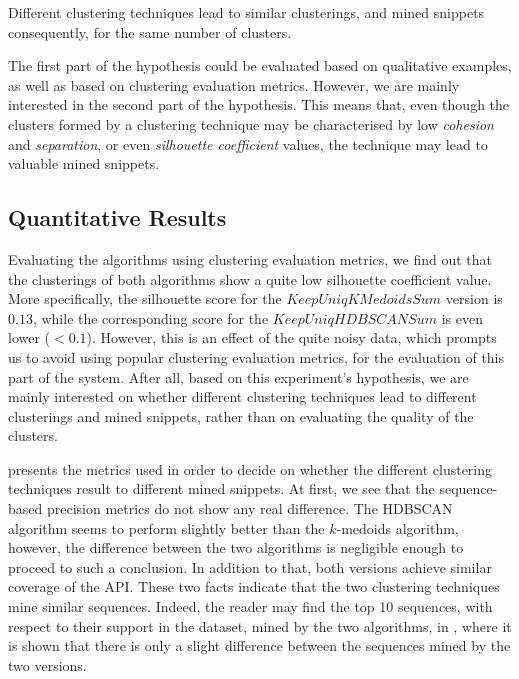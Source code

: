 \begin{hypothesis}
Different clustering techniques lead to similar clusterings, and mined snippets consequently, for the same number of clusters.
\end{hypothesis}

The first part of the hypothesis could be evaluated based on qualitative examples, as well as based on clustering evaluation metrics. However, we are mainly interested in the second part of the hypothesis. This means that, even though the clusters formed by a clustering technique may be characterised by low \textit{cohesion} and \textit{separation}, or even \textit{silhouette coefficient} values, the technique may lead to valuable mined snippets.


\subsection{Quantitative Results}
\label{subsec:evaluation-exp3-quantitative}

Evaluating the algorithms using clustering evaluation metrics, we find out that the clusterings of both algorithms show a quite low silhouette coefficient value. More specifically, the silhouette score for the $KeepUniqKMedoidsSum$ version is $0.13$, while the corresponding score for the $KeepUniqHDBSCANSum$ is even lower ($<0.1$). However, this is an effect of the quite noisy data, which prompts us to avoid using popular clustering evaluation metrics, for the evaluation of this part of the system. After all, based on this experiment's hypothesis, we are mainly interested on whether different clustering techniques lead to different clusterings and mined snippets, rather than on evaluating the quality of the clusters.

 presents the metrics used in order to decide on whether the different clustering techniques result to different mined snippets. At first, we see that the sequence-based precision metrics do not show any real difference. The HDBSCAN algorithm seems to perform slightly better than the $k$-medoids algorithm, however, the difference between the two algorithms is negligible enough to proceed to such a conclusion. In addition to that, both versions achieve similar coverage of the API. These two facts indicate that the two clustering techniques mine similar sequences. Indeed, the reader may find the top 10 sequences, with respect to their support in the dataset, mined by the two algorithms, in , where it is shown that there is only a slight difference between the sequences mined by the two versions.

